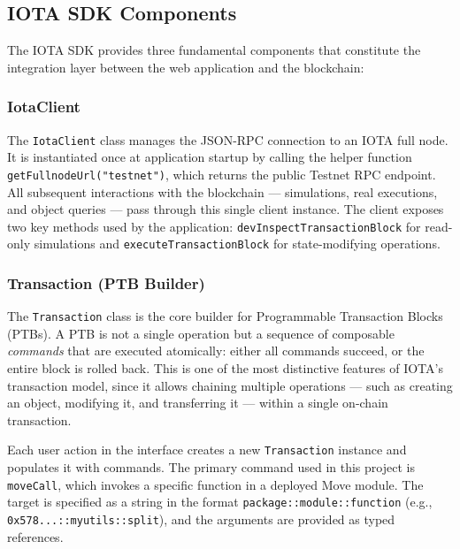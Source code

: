 \documentclass[12pt,a4paper]{article}
\begin{document}
\subsection{IOTA SDK Components}

The IOTA SDK provides three fundamental components that constitute the integration layer between the web application and the blockchain:

\subsubsection{IotaClient}

The \texttt{IotaClient} class manages the JSON-RPC connection to an IOTA full node. It is instantiated once at application startup by calling the helper function  \\ \texttt{getFullnodeUrl("testnet")}, which returns the public Testnet RPC endpoint.  \\All subsequent interactions with the blockchain --- simulations, real executions, and object queries --- pass through this single client instance. The client exposes two key methods used by the application: \texttt{devInspectTransactionBlock} for read-only simulations and \texttt{executeTransactionBlock} for state-modifying operations.

\subsubsection{Transaction (PTB Builder)}

The \texttt{Transaction} class is the core builder for Programmable Transaction Blocks (PTBs). A PTB is not a single operation but a sequence of composable \emph{commands} that are executed atomically: either all commands succeed, or the entire block is rolled back. This is one of the most distinctive features of IOTA's transaction model, since it allows chaining multiple operations --- such as creating an object, modifying it, and transferring it --- within a single on-chain transaction.

Each user action in the interface creates a new \texttt{Transaction} instance and populates it with commands. The primary command used in this project is \texttt{moveCall}, which invokes a specific function in a deployed Move module. The target is specified as a string in the format \texttt{package::module::function} (e.g., \texttt{0x578...::myutils::split}), and the arguments are provided as typed references.
\end{document}
